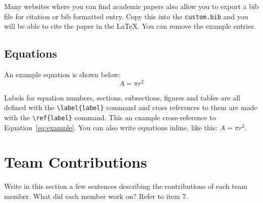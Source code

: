 \documentclass[11pt]{article}
\begin{document}
\nocite{Ando2005,andrew2007scalable,rasooli-tetrault-2015}

Many websites where you can find academic papers also allow you to export a bib file for citation or bib formatted entry. Copy this into the \texttt{custom.bib} and you will be able to cite the paper in the \LaTeX{}. You can remove the example entries.

\subsection{Equations}

An example equation is shown below:
\begin{equation}
  \label{eq:example}
  A = \pi r^2
\end{equation}

Labels for equation numbers, sections, subsections, figures and tables
are all defined with the \verb|\label{label}| command and cross references
to them are made with the \verb|\ref{label}| command.
This an example cross-reference to Equation~\ref{eq:example}. You can also write equations inline, like this: $A=\pi r^2$.



\section*{Team Contributions}

Write in this section a few sentences describing the contributions of each team member. What did each member work on? Refer to item 7.

%





\end{document}
